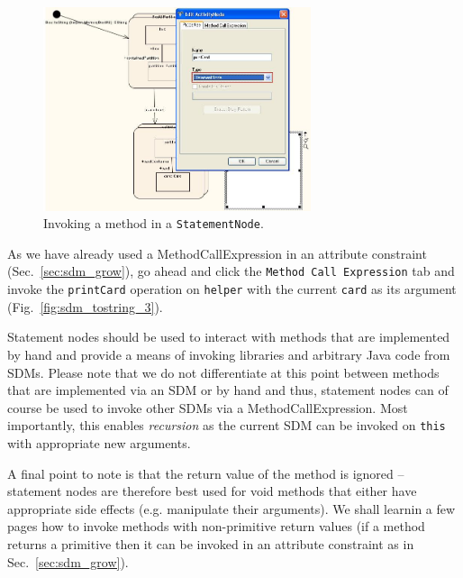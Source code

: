 \begin{figure}[htbp]
\begin{center}
  \includegraphics[width=0.7\textwidth]{pics/sdmBilder/toString/sdm73}
  \caption{Invoking a method in a \texttt{StatementNode}.}  
  \label{fig:sdm_tostring_2}
\end{center}
\end{figure}

As we have already used a MethodCallExpression in an attribute constraint
(Sec.~\ref{sec:sdm_grow}), go ahead and click the \texttt{Method Call
Expression} tab and invoke the \texttt{printCard} operation on \texttt{helper}
with the current \texttt{card} as its argument (Fig.~\ref{fig:sdm_tostring_3}).

Statement nodes should be used to interact with methods that are
implemented by hand and provide a means of invoking libraries and arbitrary Java
code from SDMs.  Please note that we do not differentiate at this point between
methods that are implemented via an SDM or by hand and thus, statement nodes can
of course be used to invoke other SDMs via a MethodCallExpression.  Most
importantly, this enables \emph{recursion} as the current SDM can be invoked on
\texttt{this} with appropriate new arguments.  

A final point to note is that the
return value of the method is ignored -- statement nodes are therefore best used
for void methods that either have appropriate side effects (e.g. manipulate
their arguments).  We shall learn\clearpage in a few pages how to invoke
methods with non-primitive return values (if a method returns a primitive then it can be
invoked in an attribute constraint as in Sec.~\ref{sec:sdm_grow}).

